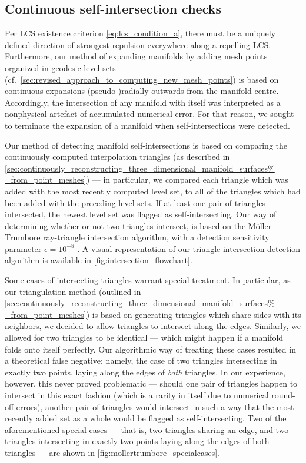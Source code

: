 \subsection{Continuous self-intersection checks}
\label{sub:continuous_self_intersection_checks}

Per LCS existence criterion \eqref{eq:lcs_condition_a}, there must be a
uniquely defined direction of strongest repulsion everywhere along a repelling
LCS. Furthermore, our method of expanding manifolds by adding mesh points
organized in geodesic level sets (cf.\
\cref{sec:revised_approach_to_computing_new_mesh_points}) is based on
continuous expansions (pseudo-)radially outwards from the manifold centre.
Accordingly, the intersection of any manifold with itself was interpreted as
a nonphysical artefact of accumulated numerical error. For that reason, we
sought to terminate the expansion of a manifold when self-intersections
were detected.

Our method of detecting manifold self-intersections is based on comparing the
continuously computed interpolation triangles (as described in
\cref{sec:continuously_reconstructing_three_dimensional_manifold_surfaces%
_from_point_meshes}) --- in particular, we compared each triangle which was
added with the most recently computed level set, to all of the
triangles which had been added with the preceding level sets. If at least one
pair of triangles intersected, the newest level set was flagged as
self-intersecting. Our way of determining whether or not two triangles
intersect, is based on the Möller-Trumbore ray-triangle intersection algorithm,
with a detection sensitivity parameter $\epsilon=10^{-8}$
\parencite{moller1997fast}. A visual representation of our
triangle-intersection detection algorithm is available in
\cref{fig:intersection_flowchart}.



Some cases of intersecting triangles warrant special treatment. In particular,
as our triangulation method (outlined in
\cref{sec:continuously_reconstructing_three_dimensional_manifold_surfaces%
_from_point_meshes}) is based on generating triangles which share sides with
its neighbors, we decided to allow triangles to intersect along the edges.
Similarly, we allowed for two triangles to be identical --- which might happen
if a manifold folds onto itself perfectly. Our algorithmic way of treating
these cases resulted in a theoretical false negative; namely, the case of two
triangles intersecting in exactly two points, laying along the edges of
\emph{both} triangles. In our experience, however, this never proved
problematic --- should one pair of triangles happen to intersect in this exact
fashion (which is a rarity in itself due to numerical round-off errors),
another pair of triangles would intersect in such a way that the most recently
added set as a whole would be flagged as self-intersecting. Two of the
aforementioned special cases --- that is, two triangles sharing an edge, and
two triangles intersecting in exactly two points laying along the edges of both
triangles --- are shown in \cref{fig:mollertrumbore_specialcases}.

